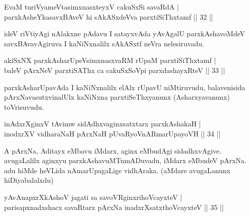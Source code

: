 
\begin{shl}
EvaM turiVyameVtasimxnasxteyxV cakuSxSi savaRdA | \\
parxkAsheYkasavxBAveV hi sAkASxdeVva parxtiSiThxtamf \hfill ||  32 || 
\end{shl}

\begin{artha} 
ideV riVtiyAgi nAlakxne pAdavu I satayxvAda yAvAgalU parxkAshavoMdeV
savxBAvavAgiruva I kaNiNxnalilx sAkASxtf neVra nelesiruvadu.
\end{artha}


\begin{shl}
akiSxNX parxkAsharUpeV\s simxnasxvaRM rUpaM parxtiSiThxtamf | \\
baleV pArxNeV parxtiSAThx ca cakuSxSoV\s pi parxdashayxRteV \hfill ||  33 || 
\end{shl}

\begin{artha} 
parxkAsharUpavAda I kaNiNxnalilx elAlx rUpavU niMtiruvudu, 
balavenisida pArxNavasutxvinalUlx kaNiNxna parxtiSeThxyanunx 
(Asharxyavanunx) toVrisuvudu.
\end{artha}


\begin{shl}
inAdxrXginxV tAvimw sidAdhxvaginxsatxtarx parxkAshakaH | \\
inodxrXV vidharaNaH pArxNaH pUvaRyoVnARmarUpayoVH \hfill ||  34 || 
\end{shl}

\begin{artha} 
A pArxNa, Aditayx eMbavu iMdarx, aginx eMbudAgi sidadhxvAgive. 
avugaLalilx aginxyu parxkAshavuMTumADuvadu, iMdarx eMbudeV pArxNa. adu 
hiMde heVLida nAmarUpagaLige vidhAraka. (aMdare avugaLanunx 
hiDiyabalalxdu)
\end{artha}


\begin{shl}
yAvAnapxrXkAshoV jagati sa savoVR\s ginxrihoVcayxteV  | \\
parisapxnadxshacx savaRtarx pArxNa inadxrXsatxthoVcayxteV \hfill ||  35 || 
\end{shl}

